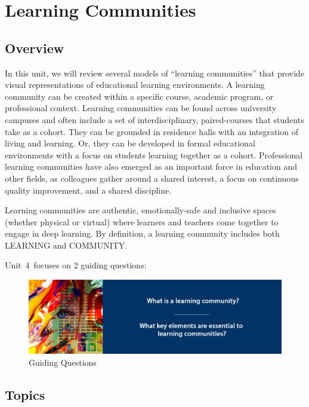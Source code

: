 \documentclass[
]{book}
\begin{document}
\hypertarget{learning-communities}{%
\chapter{Learning Communities}\label{learning-communities}}

\hypertarget{overview-3}{%
\section*{Overview}\label{overview-3}}

In this unit, we will review several models of ``learning communities'' that provide visual representations of educational learning environments. A learning community can be created within a specific course, academic program, or professional context. Learning communities can be found across university campuses and often include a set of interdisciplinary, paired-courses that students take as a cohort. They can be grounded in residence halls with an integration of living and learning. Or, they can be developed in formal educational environments with a focus on students learning together as a cohort. Professional learning communities have also emerged as an important force in education and other fields, as colleagues gather around a shared interest, a focus on continuous quality improvement, and a shared discipline.

Learning communities are authentic, emotionally-safe and inclusive spaces (whether physical or virtual) where learners and teachers come together to engage in deep learning. By definition, a learning community includes both LEARNING and COMMUNITY.

Unit~4~focuses on 2 guiding questions:

\begin{figure}
\centering
\includegraphics{assets/unit4/LDRS664-BannerUnit4.jpg}
\caption{Guiding Questions}
\end{figure}

\hypertarget{topics-3}{%
\section*{Topics}\label{topics-3}}
\end{document}
